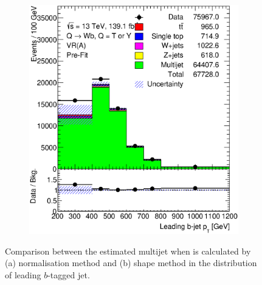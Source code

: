 \begin{figure}[hbt!]
\begin{subfigure}{.35\textwidth}
		\includegraphics[width=\linewidth,height=\textheight,keepaspectratio]{figs/chapter5/prefitbinbybin/VR_B_jet_pt.eps}
		\caption{}
		\label{fig:abcd:correctionfactor:bin:jet_pt}
	\end{subfigure}
	\caption{Comparison between the estimated multijet when \R is calculated by (a) normalisation method and (b) shape method in the \pt distribution of leading $b$-tagged jet.}
	\label{fig:abcd:correctionfactor:jet_pt}
\end{figure}



